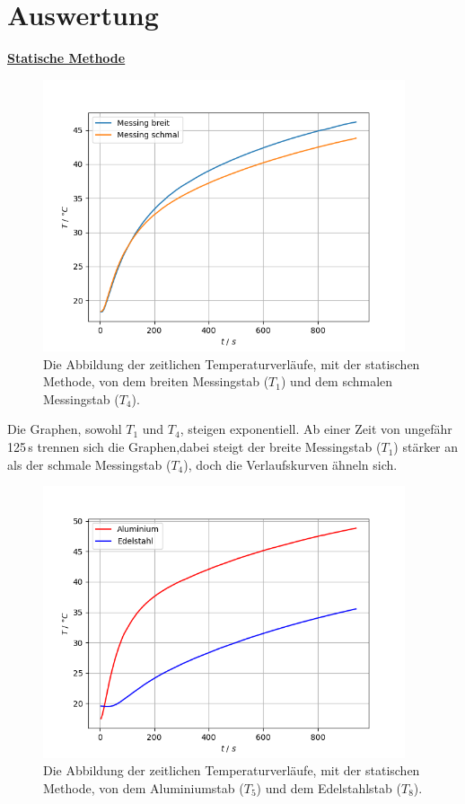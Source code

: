 \vspace{2cm}
\section{Auswertung} 

\underline{\textbf{Statische Methode}}


\begin{figure}[H]
    \centering
    \includegraphics[height=80mm]{bilder/TemprVerlStT1T4.png}
    \caption{ Die Abbildung der zeitlichen Temperaturverläufe, mit der statischen Methode, von dem breiten Messingstab ($T_{1}$) und dem schmalen Messingstab ($T_{4}$). \label{Abbildung3} }
\end{figure}

\begin{flushleft}
    Die Graphen, sowohl $T_{1}$ und $ T_{4} $, steigen exponentiell. 
    Ab einer Zeit von ungefähr 125\,\unit{\second} trennen sich die Graphen,dabei steigt der breite Messingstab ($T_{1}$) stärker an als der schmale Messingstab ($T_{4}$),
    doch die Verlaufskurven ähneln sich.
\end{flushleft}

\begin{figure}[H]
    \centering
    \includegraphics[height=80mm]{bilder/TemprVerlStT5T8.png}
    \caption{ Die Abbildung der zeitlichen Temperaturverläufe, mit der statischen Methode, von dem Aluminiumstab ($T_{5}$) und dem Edelstahlstab ($T_{8}$). \label{Abbildung4} }
\end{figure}


